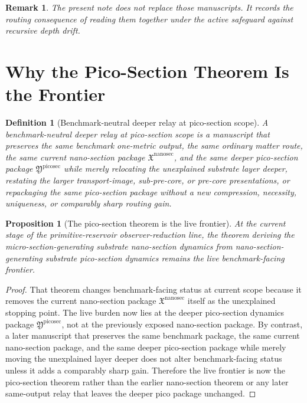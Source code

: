 \documentclass[11pt]{article}
\newcommand{\NanoSectionPackage}{\mathfrak X^{\mathrm{nanosec}}}
\newcommand{\PicoSectionPackage}{\mathfrak Y^{\mathrm{picosec}}}
\newtheorem{definition}{Definition}
\newtheorem{proposition}{Proposition}
\newtheorem{remark}{Remark}
\begin{document}
\begin{remark}
The present note does not replace those manuscripts. It records the routing consequence of reading them together under the active safeguard against recursive depth drift.
\end{remark}

\section{Why the Pico-Section Theorem Is the Frontier}

\begin{definition}[Benchmark-neutral deeper relay at pico-section scope]
A \emph{benchmark-neutral deeper relay at pico-section scope} is a manuscript that preserves the same benchmark one-metric output, the same ordinary matter route, the same current nano-section package \(\NanoSectionPackage\), and the same deeper pico-section package \(\PicoSectionPackage\) while merely relocating the unexplained substrate layer deeper, restating the larger transport-image, sub-pre-core, or pre-core presentations, or repackaging the same pico-section package without a new compression, necessity, uniqueness, or comparably sharp routing gain.
\end{definition}

\begin{proposition}[The pico-section theorem is the live frontier]
At the current stage of the primitive-reservoir observer-reduction line, the theorem deriving the micro-section-generating substrate nano-section dynamics from nano-section-generating substrate pico-section dynamics remains the live benchmark-facing frontier.
\end{proposition}

\begin{proof}
That theorem changes benchmark-facing status at current scope because it removes the current nano-section package \(\NanoSectionPackage\) itself as the unexplained stopping point. The live burden now lies at the deeper pico-section dynamics package \(\PicoSectionPackage\), not at the previously exposed nano-section package. By contrast, a later manuscript that preserves the same benchmark package, the same current nano-section package, and the same deeper pico-section package while merely moving the unexplained layer deeper does not alter benchmark-facing status unless it adds a comparably sharp gain. Therefore the live frontier is now the pico-section theorem rather than the earlier nano-section theorem or any later same-output relay that leaves the deeper pico package unchanged.
\end{proof}
\end{document}
